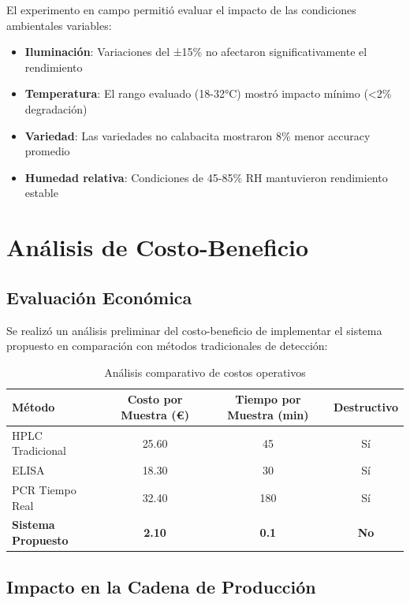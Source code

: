 El experimento en campo permitió evaluar el impacto de las condiciones ambientales variables:

\begin{itemize}
    \item \textbf{Iluminación}: Variaciones del ±15\% no afectaron significativamente el rendimiento
    \item \textbf{Temperatura}: El rango evaluado (18-32°C) mostró impacto mínimo (<2\% degradación)
    \item \textbf{Variedad}: Las variedades no calabacita mostraron 8\% menor accuracy promedio
    \item \textbf{Humedad relativa}: Condiciones de 45-85\% RH mantuvieron rendimiento estable
\end{itemize}

\section{Análisis de Costo-Beneficio}

\subsection{Evaluación Económica}

Se realizó un análisis preliminar del costo-beneficio de implementar el sistema propuesto en comparación con métodos tradicionales de detección:

\begin{table}[h!]
\centering
\caption{Análisis comparativo de costos operativos}
\begin{tabular}{|l|c|c|c|}
\hline
\textbf{Método} & \textbf{Costo por Muestra (€)} & \textbf{Tiempo por Muestra (min)} & \textbf{Destructivo} \\
\hline
HPLC Tradicional & 25.60 & 45 & Sí \\
\hline
ELISA & 18.30 & 30 & Sí \\
\hline
PCR Tiempo Real & 32.40 & 180 & Sí \\
\hline
\textbf{Sistema Propuesto} & \textbf{2.10} & \textbf{0.1} & \textbf{No} \\
\hline
\end{tabular}
\label{tab:cost_analysis}
\end{table}

\subsection{Impacto en la Cadena de Producción}

